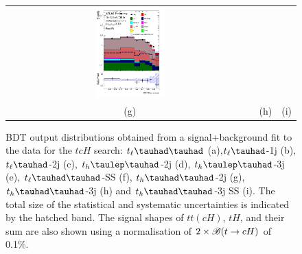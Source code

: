 \begin{figure}[H]
\begin{tabular}{@{}ccc@{}}
\includegraphics[width=0.29\textwidth]{figures/tcH_reg2mtau1b3jss.pdf}\\
(g) & (h)  & (i) \\
\end{tabular}
\caption{ BDT output distributions obtained from a signal+background fit to the data for the $tcH$ search: 
$t_{\ell}\thadhad$ (a),$t_{\ell}\tauhad$-1j (b),  $t_{\ell}\tauhad$-2j (c), $t_h\tlhad$-2j (d), $t_h\tlhad$-3j (e), $t_{\ell}\thadhad$-SS (f), $t_h\thadhad$-2j (g), $t_h\thadhad$-3j (h) and $t_h\thadhad$-3j SS (i). 
The total size of the statistical and systematic
uncertainties is indicated by the hatched band. The signal shapes of $tt(cH)$, $tH$, and their sum are also shown using a normalisation of $2 \times\mathscr{B}(t\to cH)$ of 0.1\%.
}
\label{fig:asimov_postfitbdtHc}
\end{figure}

